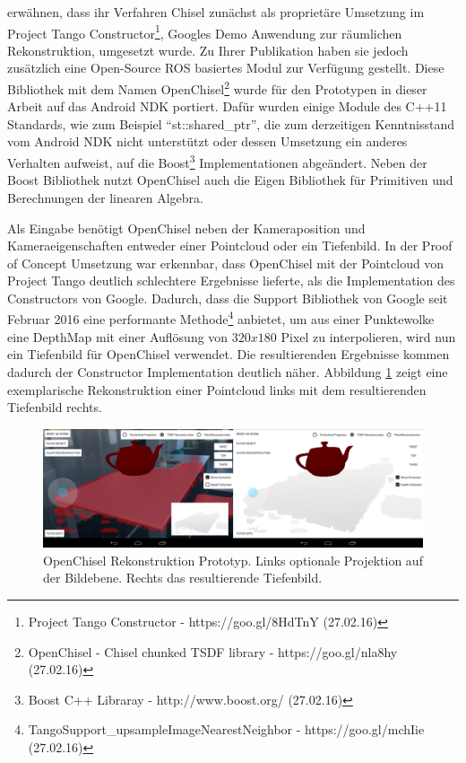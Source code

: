 \citet{Klingensmith_2015_7924} erwähnen, dass ihr Verfahren Chisel zunächst als proprietäre Umsetzung im Project Tango Constructor\footnote{Project Tango Constructor - https://goo.gl/8HdTnY (27.02.16)}, Googles Demo Anwendung zur räumlichen Rekonstruktion, umgesetzt wurde. Zu Ihrer Publikation haben sie jedoch zusätzlich eine Open-Source ROS basiertes Modul zur Verfügung gestellt. Diese Bibliothek mit dem Namen OpenChisel\footnote{OpenChisel - Chisel chunked TSDF library - https://goo.gl/nla8hy (27.02.16)} wurde für den Prototypen in dieser Arbeit auf das Android NDK portiert. Dafür wurden einige Module des C++11 Standards, wie zum Beispiel \enquote{st::shared\_ptr}, die zum derzeitigen Kenntnisstand vom Android NDK nicht unterstützt oder dessen Umsetzung ein anderes Verhalten aufweist, auf die Boost\footnote{Boost C++ Libraray - http://www.boost.org/ (27.02.16)} Implementationen abgeändert. Neben der Boost Bibliothek nutzt OpenChisel auch die Eigen Bibliothek für Primitiven und Berechnungen der linearen Algebra.

Als Eingabe benötigt OpenChisel neben der Kameraposition und Kameraeigenschaften entweder einer Pointcloud oder ein Tiefenbild. In der Proof of Concept Umsetzung war erkennbar, dass OpenChisel mit der Pointcloud von Project Tango deutlich schlechtere Ergebnisse lieferte, als die Implementation des Constructors von Google. Dadurch, dass die Support Bibliothek von Google seit Februar 2016 eine performante Methode\footnote{TangoSupport\_upsampleImageNearestNeighbor - https://goo.gl/mchIie (27.02.16)} anbietet, um aus einer Punktewolke eine DepthMap mit einer Auflösung von \(320x180\) Pixel zu interpolieren, wird nun ein Tiefenbild für OpenChisel verwendet. Die resultierenden Ergebnisse kommen dadurch der Constructor Implementation deutlich näher. Abbildung \ref{fig:chisel-demo} zeigt eine exemplarische Rekonstruktion einer Pointcloud links mit dem resultierenden Tiefenbild rechts.

\begin{figure}[h]
  \centering
	\includegraphics[width=1.0\textwidth]{content/images/implementation/chisel-demo.png} 
  \caption{OpenChisel Rekonstruktion Prototyp. Links optionale Projektion auf der Bildebene. Rechts das resultierende Tiefenbild.}
  \label{fig:chisel-demo}
\end{figure}


